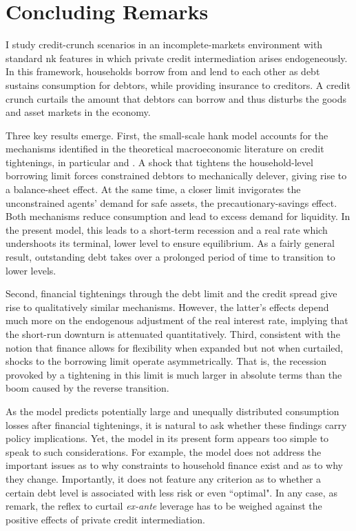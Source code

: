 \documentclass[a4paper,12pt]{article} %
\numberwithin{equation}{section} %
\numberwithin{figure}{section}
\numberwithin{table}{section}
\begin{document}
\section{Concluding Remarks}
\label{sec:conclusion}

I study credit-crunch scenarios in an incomplete-markets environment with standard \Gls{nk} features in which private credit intermediation arises endogeneously. In this framework, households borrow from and lend to each other as debt sustains consumption for debtors, while providing insurance to creditors. A credit crunch curtails the amount that debtors can borrow and thus disturbs the goods and asset markets in the economy. 

Three key results emerge. First, the small-scale \Gls{hank} model accounts for the mechanisms identified in the theoretical macroeconomic literature on credit tightenings, in particular \textcite{egg2012} and \textcite{gl2017}. A shock that tightens the household-level borrowing limit forces constrained debtors to mechanically delever, giving rise to a balance-sheet effect. At the same time, a closer limit invigorates the unconstrained agents' demand for safe assets, the precautionary-savings effect. Both mechanisms reduce consumption and lead to excess demand for liquidity. In the present model, this leads to a short-term recession and a real rate which undershoots its terminal, lower level to ensure equilibrium. As a fairly general result, outstanding debt takes over a prolonged period of time to transition to lower levels.

Second, financial tightenings through the debt limit and the credit spread give rise to qualitatively similar mechanisms. However, the latter's effects depend much more on the endogenous adjustment of the real interest rate, implying that the short-run downturn is attenuated quantitatively. Third, consistent with the notion that finance allows for flexibility when expanded but not when curtailed, shocks to the borrowing limit operate asymmetrically. That is, the recession provoked by a tightening in this limit is much larger in absolute terms than the boom caused by the reverse transition.

As the model predicts potentially large and unequally distributed consumption losses after financial tightenings, it is natural to ask whether these findings carry policy implications. Yet, the model in its present form appears too simple to speak to such considerations. For example, the model does not address the important issues as to why constraints to household finance exist and as to why they change. Importantly, it does not feature any criterion as to whether a certain debt level is associated with less risk or even ``optimal". In any case, as \textcite{korinek2016} remark, the reflex to curtail \textit{ex-ante} leverage has to be weighed against the positive effects of private credit intermediation. 
\end{document}
